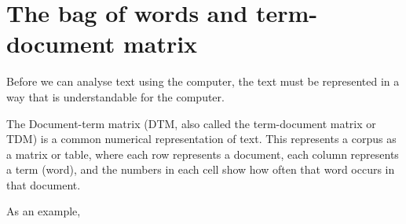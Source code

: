 \section{The bag of words and term-document matrix}
\label{sec:dtm}

Before we can analyse text using the computer, the text must be represented in a way that is understandable for the computer.

The Document-term matrix (DTM, also called the term-document matrix or TDM) is a common numerical representation of text.
This represents a corpus as a matrix or table, where each row represents a document, each column represents a term (word),
and the numbers in each cell show how often that word occurs in that document.


As an example, 
